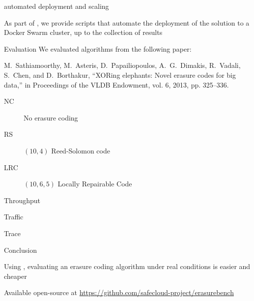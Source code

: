 \begin{frame}{\sys\enspace automated deployment and scaling}
  \begin{snugshade}
    As part of \sys, we provide scripts that automate the deployment of the solution to a Docker Swarm cluster, up to the collection of results
  \end{snugshade}
\end{frame}

\subtitle[Evaluation]{Evaluation}

\begin{frame}{Evaluation}
    We evaluated algorithms from the following paper:

    \begin{snugshade}
        \footnotesize
        M.~Sathiamoorthy, M.~Asteris, D.~Papailiopoulos, A.~G.~Dimakis, R.~Vadali, S.~Chen, and D.~Borthakur, “XORing elephants: Novel erasure codes for big data,” in Proceedings of the VLDB Endowment, vol. 6, 2013, pp. 325–336.
    \end{snugshade}
    
    \begin{description}
        \item[NC] No erasure coding
        \item[RS] $(10,4)$ Reed-Solomon code
        \item[LRC] $(10,6,5)$ Locally Repairable Code
    \end{description}
\end{frame}

\begin{frame}{Throughput}
    \begin{figure}
        
    \end{figure}
\end{frame}

\begin{frame}{Traffic}
    \begin{figure}
        
    \end{figure}
\end{frame}

\begin{frame}{Trace}
    \begin{figure}
        
    \end{figure}
\end{frame}

\subtitle[Conclusion]{Conclusion}

\begin{frame}{Conclusion}

  \begin{snugshade}
    Using \sys, evaluating an erasure coding algorithm under real conditions is easier and cheaper
  \end{snugshade}
  
  \begin{snugshade}
    Available open-source at \url{https://github.com/safecloud-project/erasurebench}    
  \end{snugshade}

\end{frame}




